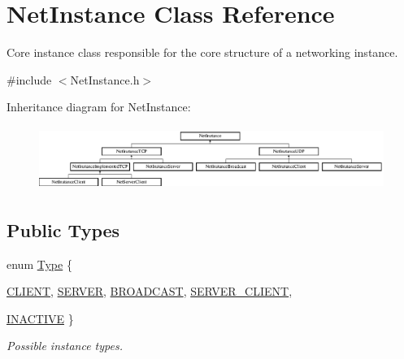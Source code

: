 \hypertarget{class_net_instance}{
\section{NetInstance Class Reference}
\label{class_net_instance}
}


Core instance class responsible for the core structure of a networking instance.  




{\ttfamily \#include $<$NetInstance.h$>$}

Inheritance diagram for NetInstance:\begin{figure}[H]
\begin{center}
\leavevmode
\includegraphics[height=2.085661cm]{class_net_instance}
\end{center}
\end{figure}
\subsection*{Public Types}
\begin{DoxyCompactItemize}
\item 
enum \hyperlink{class_net_instance_a0ec01a76d9b78794cfbdeab10a436cdc}{Type} \{ \par
\hyperlink{class_net_instance_a0ec01a76d9b78794cfbdeab10a436cdca508124ab62368682064b3426f41042fd}{CLIENT}, 
\hyperlink{class_net_instance_a0ec01a76d9b78794cfbdeab10a436cdca63eff5d4d29668e163da47a29638516a}{SERVER}, 
\hyperlink{class_net_instance_a0ec01a76d9b78794cfbdeab10a436cdca147898bd37bd1b60c7d24332fdd14aea}{BROADCAST}, 
\hyperlink{class_net_instance_a0ec01a76d9b78794cfbdeab10a436cdcac36db18c34b893784a650878756c1097}{SERVER\_\-CLIENT}, 
\par
\hyperlink{class_net_instance_a0ec01a76d9b78794cfbdeab10a436cdca88c09e9cfed79e86db169ca2b8ea5457}{INACTIVE}
 \}
\begin{DoxyCompactList}\small\item\em Possible instance types. \item\end{DoxyCompactList}\end{DoxyCompactItemize}
